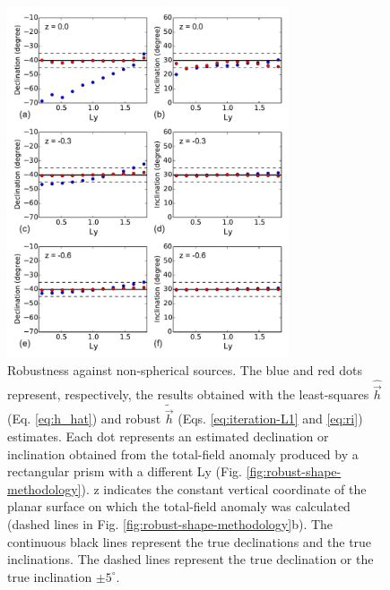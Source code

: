 \documentclass[journal abbreviation, npg]{copernicus}
\begin{document}
\begin{figure}[t]
\vspace*{2mm}
\begin{center}
\includegraphics[width=8.3cm]{Figures/Fig6.pdf}
\end{center}
\caption{Robustness against non-spherical sources. The blue and red dots represent, respectively, the results obtained with the least-squares $\hat{\vec{h}}$ (Eq. \ref{eq:h_hat}) and robust $\tilde{\vec{h}}$ (Eqs. \ref{eq:iteration-L1} and \ref{eq:ri}) estimates. Each dot represents an estimated declination or inclination obtained from the total-field anomaly produced by a rectangular prism with a different Ly (Fig. \ref{fig:robust-shape-methodology}). z indicates the constant vertical coordinate of the planar surface on which the total-field anomaly was calculated (dashed lines in Fig. \ref{fig:robust-shape-methodology}b). The continuous black lines represent the true declinations and the true inclinations. The dashed lines represent the true declination or the true inclination $\pm 5^{\circ}$.} 
\label{fig:robust-shape-results}
\end{figure}

\end{document}
